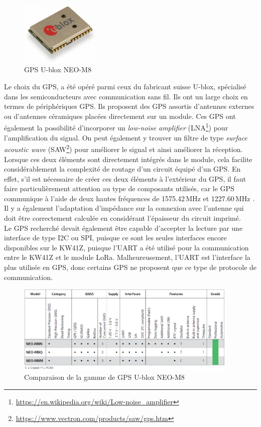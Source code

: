 \begin{figure}[ht!]
    \centering
    \includegraphics[width=0.35\textwidth]{Figures/Hardware/neo_3d_model.png}
    \caption{GPS U-blox NEO-M8}
    \label{fig-neo_3d_model}
\end{figure}

Le choix du GPS, a été opéré parmi ceux du fabricant suisse U-blox, spécialisé dans les semiconducteurs avec communication sans fil. Ils ont un large choix en termes de périphériques GPS. Ils proposent des GPS assortis d'antennes externes ou d'antennes céramiques placées directement sur un module. Ces GPS ont également la possibilité d'incorporer un \textit{low-noise amplifier} (LNA\footnote{\url{https://en.wikipedia.org/wiki/Low-noise_amplifier}}) pour l'amplification du signal. On peut également y trouver un filtre de type \textit{surface acoustic wave} (SAW\footnote{\url{https://www.vectron.com/products/saw/gps.htm}}) pour améliorer le signal et ainsi améliorer la réception. Lorsque ces deux éléments sont directement intégrés dans le module, cela facilite considérablement la complexité de routage d'un circuit équipé d'un GPS. En effet, s'il est nécessaire de créer ces deux éléments à l'extérieur du GPS, il faut faire particulièrement attention au type de composants utilisés, car le GPS communique à l'aide de deux hautes fréquences de 1575.42\,MHz et 1227.60\,MHz \cite{GPSsigna51:online}. Il y a également l'adaptation d'impédance sur la connexion avec l'antenne qui doit être correctement calculée en considérant l'épaisseur du circuit imprimé. \\

Le GPS recherché devait également être capable d'accepter la lecture par une interface de type I2C ou SPI, puisque ce sont les seules interfaces encore disponibles sur le KW41Z, puisque l'UART a été utilisé pour la communication entre le KW41Z et le module LoRa. Malheureusement, l'UART est l'interface la plus utilisée en GPS, donc certains GPS ne proposent que ce type de protocole de communication.

\begin{figure}[ht!]
    \centering
    \includegraphics[width=0.95\textwidth]{Figures/Hardware/gps_neo_comparaison.png}
    \caption{Comparaison de la gamme de GPS U-blox NEO-M8}
    \label{fig-gps_neo_comparaison}
\end{figure}

